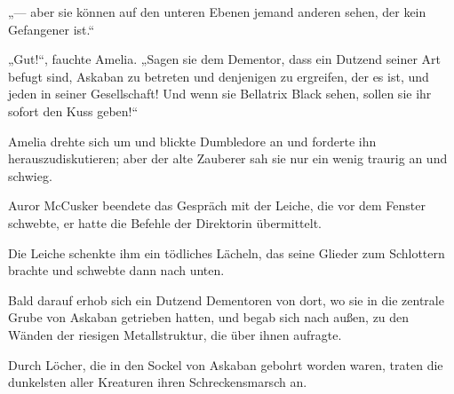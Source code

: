 „— aber sie können auf den unteren Ebenen jemand anderen sehen, der kein Gefangener ist.“

„Gut!“, fauchte Amelia.
„Sagen sie dem Dementor, dass ein Dutzend seiner Art befugt sind, Askaban zu betreten und denjenigen zu ergreifen, der es ist, und jeden in seiner Gesellschaft! Und wenn sie Bellatrix Black sehen, sollen sie ihr sofort den Kuss geben!“

Amelia drehte sich um und blickte Dumbledore an und forderte ihn herauszudiskutieren; aber der alte Zauberer sah sie nur ein wenig traurig an und schwieg.

\later

Auror McCusker beendete das Gespräch mit der Leiche, die vor dem Fenster schwebte, er hatte die Befehle der Direktorin übermittelt.

Die Leiche schenkte ihm ein tödliches Lächeln, das seine Glieder zum Schlottern brachte und schwebte dann nach unten.

Bald darauf erhob sich ein Dutzend Dementoren von dort, wo sie in die zentrale Grube von Askaban getrieben hatten, und begab sich nach außen, zu den Wänden der riesigen Metallstruktur, die über ihnen aufragte.

Durch Löcher, die in den Sockel von Askaban gebohrt worden waren, traten die dunkelsten aller Kreaturen ihren Schreckensmarsch an.

